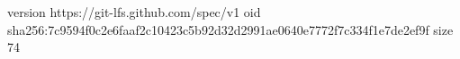 version https://git-lfs.github.com/spec/v1
oid sha256:7c9594f0c2e6faaf2c10423c5b92d32d2991ae0640e7772f7c334f1e7de2ef9f
size 74
